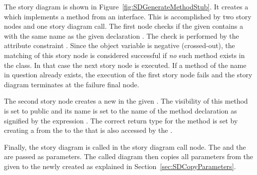 The story diagram  is shown in Figure~\ref{fig:SDGenerateMethodStub}. It creates a  which implements a method  from an interface. This is accomplished by two story nodes and one story diagram call. The first node checks if the given  contains a  with the same name as the given declaration . The check is performed by the attribute constraint . Since the object variable  is negative (crossed-out), the matching of this story node is considered successful if \emph{no} such method exists in the class. In that case the next story node is executed. If a method of the name in question already exists, the execution of the first story node fails and the story diagram terminates at the failure final node.

The second story node creates a new  in the given . The visibility of this method is set to public and its name is set to the name of the method declaration as signified by the expression . The correct return type for the method is set by creating a  from the  to the  that is also accessed by the .

Finally, the story diagram  is called in the story diagram call node. The  and the  are passed as parameters. The called diagram then copies all parameters from the given  to the newly created  as explained in Section~\ref{sec:SDCopyParameters}.